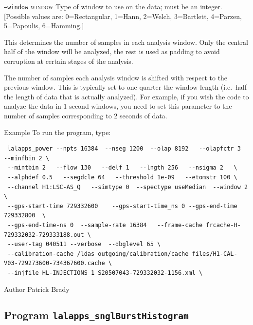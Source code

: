 \begin{entry}
\begin{entry}
\item[\option{--window} \parm{window}]
\item[\texttt{--window} \textsc{window}] Type of window to use on the data;
must be an integer.  [Possible values are:  0=Rectangular, 1=Hann,
2=Welch, 3=Bartlett, 4=Parzen, 5=Papoulis, 6=Hamming.]

\item[\option{--window-length} \parm{samples}]
This determines the number of samples in each analysis window.  Only the
central half of the window will be analyzed, the rest is used as padding to
avoid corruption at certain stages of the analysis.

\item[\option{--window-shift} \parm{samples}]
The number of samples each analysis window is shifted with respect to the
previous window.  This is typically set to one quarter the window length
(i.e.\ half the length of data that is actually analyzed).  For example, if
you wish the code to analyze the data in 1 second windows, you need to set
this parameter to the number of samples corresponding to 2 seconds of data.

\end{entry}


\item[Example]
To run the program,  type:
\begin{verbatim}
 lalapps_power --npts 16384  --nseg 1200  --olap 8192   --olapfctr 3   --minfbin 2 \
 --mintbin 2   --flow 130   --delf 1   --lngth 256   --nsigma 2   \
 --alphdef 0.5   --segdcle 64   --threshold 1e-09   --etomstr 100 \
 --channel H1:LSC-AS_Q   --simtype 0  --spectype useMedian  --window 2 \
 --gps-start-time 729332600    --gps-start-time_ns 0 --gps-end-time 729332800  \
 --gps-end-time-ns 0  --sample-rate 16384   --frame-cache frcache-H-729332032-729333188.out \
 --user-tag 040511 --verbose  --dbglevel 65 \
 --calibration-cache /ldas_outgoing/calibration/cache_files/H1-CAL-V03-729273600-734367600.cache \
 --injfile HL-INJECTIONS_1_S20507043-729332032-1156.xml \
\end{verbatim}

\item[Author]
Patrick Brady
\end{entry}
\clearpage

\subsection{Program \texttt{lalapps\_snglBurstHistogram}}
\label{program:lalapps-snglBurstHistogram}

